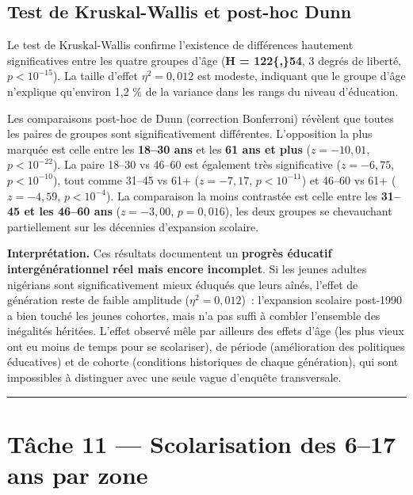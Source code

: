 \documentclass[
]{article}
\begin{document}
\subsection{Test de Kruskal-Wallis et post-hoc
Dunn}\label{test-de-kruskal-wallis-et-post-hoc-dunn}

Le test de Kruskal-Wallis confirme l'existence de différences hautement
significatives entre les quatre groupes d'âge (\textbf{H = 122\{,\}54},
3 degrés de liberté, \(p < 10^{-15}\)). La taille d'effet
\(\eta^2 = 0{,}012\) est modeste, indiquant que le groupe d'âge
n'explique qu'environ 1,2 \% de la variance dans les rangs du niveau
d'éducation.

Les comparaisons post-hoc de Dunn (correction Bonferroni) révèlent que
toutes les paires de groupes sont significativement différentes.
L'opposition la plus marquée est celle entre les \textbf{18--30 ans} et
les \textbf{61 ans et plus} (\(z = -10{,}01\), \(p < 10^{-22}\)). La
paire 18--30 vs 46--60 est également très significative
(\(z = -6{,}75\), \(p < 10^{-10}\)), tout comme 31--45 vs 61+
(\(z = -7{,}17\), \(p < 10^{-11}\)) et 46--60 vs 61+ (\(z = -4{,}59\),
\(p < 10^{-4}\)). La comparaison la moins contrastée est celle entre les
\textbf{31--45 et les 46--60 ans} (\(z = -3{,}00\), \(p = 0{,}016\)),
les deux groupes se chevauchant partiellement sur les décennies
d'expansion scolaire.

\begin{interpretbox}
\textbf{Interprétation.} Ces résultats documentent un \textbf{progrès éducatif intergénérationnel réel mais encore incomplet}. Si les jeunes adultes nigérians sont significativement mieux éduqués que leurs aînés, l'effet de génération reste de faible amplitude ($\eta^2 = 0{,}012$)~: l'expansion scolaire post-1990 a bien touché les jeunes cohortes, mais n'a pas suffi à combler l'ensemble des inégalités héritées. L'effet observé mêle par ailleurs des effets d'âge (les plus vieux ont eu moins de temps pour se scolariser), de période (amélioration des politiques éducatives) et de cohorte (conditions historiques de chaque génération), qui sont impossibles à distinguer avec une seule vague d'enquête transversale.
\end{interpretbox}

\begin{center}\rule{0.5\linewidth}{0.5pt}\end{center}

\section{Tâche 11 --- Scolarisation des 6--17 ans par
zone}\label{tuxe2che-11-scolarisation-des-617-ans-par-zone}
\end{document}
